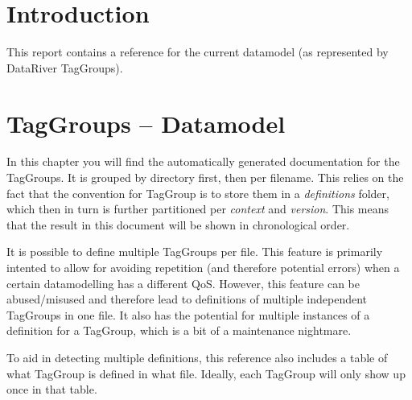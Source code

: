 \documentclass{report}
\begin{document}
	\chapter{Introduction}
	This report contains a reference for the current datamodel (as represented by DataRiver TagGroups).
	\tableofcontents
	\listoftables
	\chapter{TagGroups -- Datamodel}
	In this chapter you will find the automatically generated documentation for the TagGroups. It is grouped by directory first, then per filename. This relies on the fact that the convention for TagGroup is to store them in a \textit{definitions} folder, which then in turn is further partitioned per \textit{context} and \textit{version}. This means that the result in this document will be shown in chronological order. 

	It is possible to define multiple TagGroups per file. This feature is primarily intented to allow for avoiding repetition (and therefore potential errors) when a certain datamodelling has a different QoS. However, this feature can be abused/misused and therefore lead to definitions of multiple independent TagGroups in one file. It also has the potential for multiple instances of a definition for a TagGroup, which is a bit of a maintenance nightmare. 

	To aid in detecting multiple definitions, this reference also includes a table of what TagGroup is defined in what file. Ideally, each TagGroup will only show up once in that table.

\end{document}
